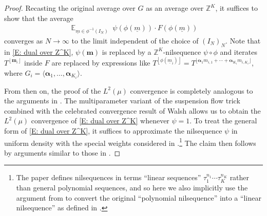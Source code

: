 \documentclass[11pt]{amsart}
\theoremstyle{definition}
\DeclareMathOperator*{\E}{\mathbb{E}}
\newcommand{\Z}{{\mathbb Z}}
\newcommand{\bm}{{\mathbf{m}}}
\newcommand{\balpha}{{\boldsymbol{\alpha}}}
\newcommand{\um}{{\underline{m}}}
\newcommand{\inv}{^{-1}}
\newcommand{\1}{{\mathbf{1}}}
\DeclareMathOperator{\Nil}{Nil}
\newcommand{\floor}[1]{{\left \lfloor #1 \right \rfloor}}
\newcommand{\sfloor}[1]{{\lfloor #1 \rfloor}}
\begin{document}
\begin{proof}
    Recasting the original average over $G$ as an average over $\Z^K$, it suffices to show that the average
    \begin{align}\label{E: dual over Z^K}
       \E_{{\um}\in \phi\inv(I_N)}\; \psi(\phi(\um)) \cdot  F(\phi(\um))
    \end{align}
    converges as $N\to\infty$ to the limit independent of the choice of $(I_N)_N$. Note that in \eqref{E: dual over Z^K}, $\psi(\bm)$ is replaced by a $\Z^{K}$-nilsequence $\psi\circ\phi$ and iterates $T^{\floor{\bm_i}}$ inside $F$ are replaced by expressions like $T^{\floor{\phi(\um_i)}}=T^{\sfloor{\balpha_1 m_{i,1} + \cdots + \balpha_{K_i} m_{i, K_i}}}$, where $G_i = \langle \balpha_1, \ldots, \balpha_{K_i}\rangle$. 
    
    
    From then on, the proof of the $L^2(\mu)$ convergence is completely analogous to the arguments in \cite[Section 3]{Ko18}. %
    The multiparameter variant of the suspension flow trick \cite[Theorem~3.2]{Ko18} combined with the celebrated convergence result of Walsh \cite{W12} allows us to obtain the $L^2(\mu)$ convergence of \eqref{E: dual over Z^K} whenever $\psi= 1$.  
    To treat the general form of \eqref{E: dual over Z^K}, it suffices to approximate the nilsequence $\psi$ in uniform density with the special weights considered in \cite[Proposition~4.2]{FH18}.\footnote{The paper \cite{FH18} defines nilsequences in terms ``linear sequences'' $\tau_1^{n_1}\cdots \tau_K^{n_K}$ rather than general polynomial sequences, and so here we also implicitly use the argument from \cite[Section 2.11]{L05c} to convert the original ``polynomial nilsequence'' into a ``linear nilsequence'' as defined in \cite{FH18}.} 
    The claim then follows by arguments similar to those in \cite[Section~3]{Ko18}.


\end{proof}
\end{document}
